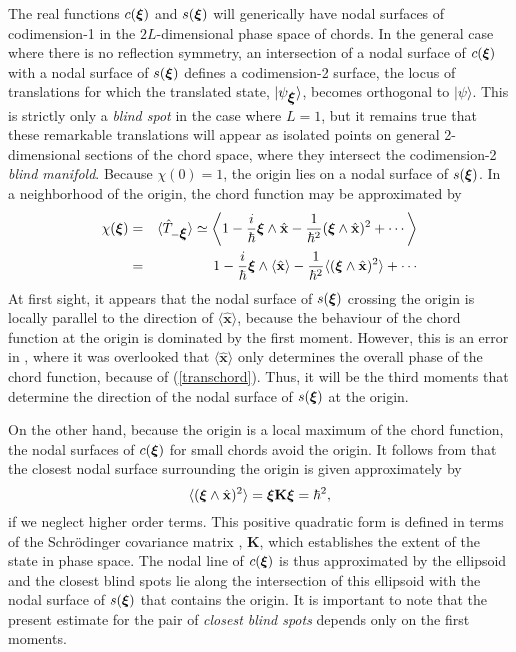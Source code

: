 \documentclass[12pt]{iopart}
\newcommand{\x}{{\mathbf x}}
\newcommand{\vct}[1]{\ensuremath\mbox{\boldmath$ #1 $}}
\newcommand{\Vxi}{\vct \xi}
\begin{document}
The real functions $c(\Vxi)$ and $s(\Vxi)$ will generically have nodal surfaces of codimension-1
in the $2L$-dimensional phase space of chords.
In the general case where there is no reflection symmetry, an intersection of a nodal surface
of $c(\Vxi)$ with a nodal surface of $s(\Vxi)$ defines a codimension-2 surface, 
the locus of translations for which the translated state, $|\psi_{\Vxi}\rangle$, 
becomes orthogonal to $|\psi\rangle$. This is strictly only a {\it blind spot} \cite{Blind,ZOA10}
in the case where $L=1$, but it remains true that these remarkable translations will appear as
isolated points on general 2-dimensional sections of the chord space, where they intersect
the codimension-2 {\it blind manifold}. 
Because $\chi(0)= 1$, the origin lies on a nodal surface of $s(\Vxi)$.
In a neighborhood of the origin, the chord function may be approximated by
\begin{eqnarray}
\chi(\Vxi)&=&\langle\hat T_{-\Vxi}\rangle
\simeq
\left\langle1-\frac{i}{\hbar}\Vxi\wedge\hat \x-\frac{1}{\hbar^2}(\Vxi\wedge\hat \x)^2+\cdots\right\rangle
\\&=&
1-\frac{i}\hbar\Vxi\wedge\langle\hat \x\rangle-\frac{1}{\hbar^2}\langle(\Vxi\wedge\hat \x)^2\rangle+\cdots
\label{aproxto2}
\end{eqnarray}
At first sight, it appears that the nodal surface of $s(\Vxi)$ crossing the origin is locally parallel 
to the direction of $\langle\hat\x\rangle$, because the behaviour of the chord function at the origin 
is dominated by the first moment. However, this is an error in \cite{ZOA10}, where it was overlooked
that $\langle\hat\x\rangle$ only determines the overall phase of the chord function, because of (\ref{transchord}).
Thus, it will be the third moments that determine the direction of the nodal surface of $s(\Vxi)$ at the origin.
 
On the other hand, because the origin is a local maximum of the chord function, 
the nodal surfaces of $c(\Vxi)$ for small chords avoid the origin. 
It follows from  that the  closest nodal surface surrounding the origin is given approximately by
\begin{equation}
\langle(\Vxi\wedge\hat \x)^2\rangle =  \Vxi \mathbf K \Vxi = \hbar^2,
\label{ellipse}
\end{equation} 
if we neglect higher order terms. This positive quadratic form is defined in terms of 
the Schr\"odinger covariance matrix 
\cite{Schr}, $\mathbf K$, which establishes the extent of the state in phase space.
The nodal line of $c(\Vxi)$ is thus approximated by the ellipsoid  and the closest blind spots 
lie along the intersection of this ellipsoid with the nodal surface of $s(\Vxi)$ that contains the origin. 
It is important to note that the present estimate for the pair of {\it closest blind spots}
depends only on the first moments.
\end{document}
